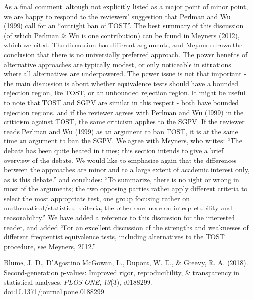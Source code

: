 \documentclass[man]{apa6}
\begin{document}
As a final comment, altough not explicitly listed as a major point of minor point, we are happy to respond to the reviewers' suggestion that Perlman and Wu (1999) call for an \enquote{outright ban of TOST}. The best summary of this discussion (of which Perlman \& Wu is one contribution) can be found in Meyners (2012), which we cited. The discussion has different arguments, and Meyners draws the conclusion that there is no universially preferred approach. The power benefits of alternative approaches are typically modest, or only noticeable in situations where all alternatives are underpowered. The power issue is not that important - the main discussion is about whether equivalence tests should have a bounded rejection region, ike TOST, or an unbounded rejection region. It might be useful to note that TOST and SGPV are similar in this respect - both have bounded rejection regions, and if the reviewer agrees with Perlman and Wu (1999) in the criticism against TOST, the same criticism applies to the SGPV. If the reviewer reads Perlman and Wu (1999) as an argument to ban TOST, it is at the same time an argument to ban the SGPV. We agree with Meyners, who writes: \enquote{The debate has been quite heated in times; this section intends to give a brief overview of the debate. We would like to emphasize again that the differences between the approaches are minor and to a large extent of academic interest only, as is this debate.} and concludes: \enquote{To summarize, there is no right or wrong in most of the arguments; the two opposing parties rather apply different criteria to select the most appropriate test, one group focusing rather on mathematical/statistical criteria, the other one more on interpretability and reasonability.} We have added a reference to this discussion for the interested reader, and added \enquote{For an excellent discussion of the strengths and weaknesses of different frequentist equivalence tests, including alternatives to the TOST procedure, see Meyners, 2012.}

\begingroup
\setlength{\parindent}{-0.5in}
\setlength{\leftskip}{0.5in}

\hypertarget{refs}{}
\leavevmode\hypertarget{ref-blume_second-generation_2018}{}%
Blume, J. D., D'Agostino McGowan, L., Dupont, W. D., \& Greevy, R. A. (2018). Second-generation p-values: Improved rigor, reproducibility, \& transparency in statistical analyses. \emph{PLOS ONE}, \emph{13}(3), e0188299. doi:\href{https://doi.org/10.1371/journal.pone.0188299}{10.1371/journal.pone.0188299}

\endgroup
\end{document}
